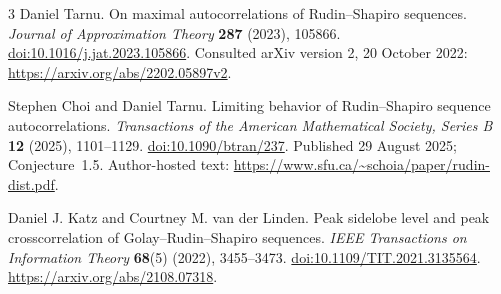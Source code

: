 \documentclass[11pt,a4paper]{article}
\theoremstyle{definition}\newtheorem{definition}[theorem]{Definition}
\theoremstyle{remark}\newtheorem{remark}[theorem]{Remark}
\begin{document}
\begin{thebibliography}{3}
Daniel Tarnu.
\newblock On maximal autocorrelations of Rudin--Shapiro sequences.
\newblock \emph{Journal of Approximation Theory} \textbf{287} (2023), 105866.
\newblock \href{https://doi.org/10.1016/j.jat.2023.105866}{doi:10.1016/j.jat.2023.105866}.
\newblock Consulted arXiv version 2, 20 October 2022:
\url{https://arxiv.org/abs/2202.05897v2}.

Stephen Choi and Daniel Tarnu.
\newblock Limiting behavior of Rudin--Shapiro sequence autocorrelations.
\newblock \emph{Transactions of the American Mathematical Society, Series B}
\textbf{12} (2025), 1101--1129.
\newblock \href{https://doi.org/10.1090/btran/237}{doi:10.1090/btran/237}.
\newblock Published 29 August 2025; Conjecture~1.5.
\newblock Author-hosted text:
\url{https://www.sfu.ca/~schoia/paper/rudin-dist.pdf}.

Daniel J. Katz and Courtney M. van der Linden.
\newblock Peak sidelobe level and peak crosscorrelation of
Golay--Rudin--Shapiro sequences.
\newblock \emph{IEEE Transactions on Information Theory}
\textbf{68}(5) (2022), 3455--3473.
\newblock \href{https://doi.org/10.1109/TIT.2021.3135564}{doi:10.1109/TIT.2021.3135564}.
\newblock \url{https://arxiv.org/abs/2108.07318}.
\end{thebibliography}
\end{document}
